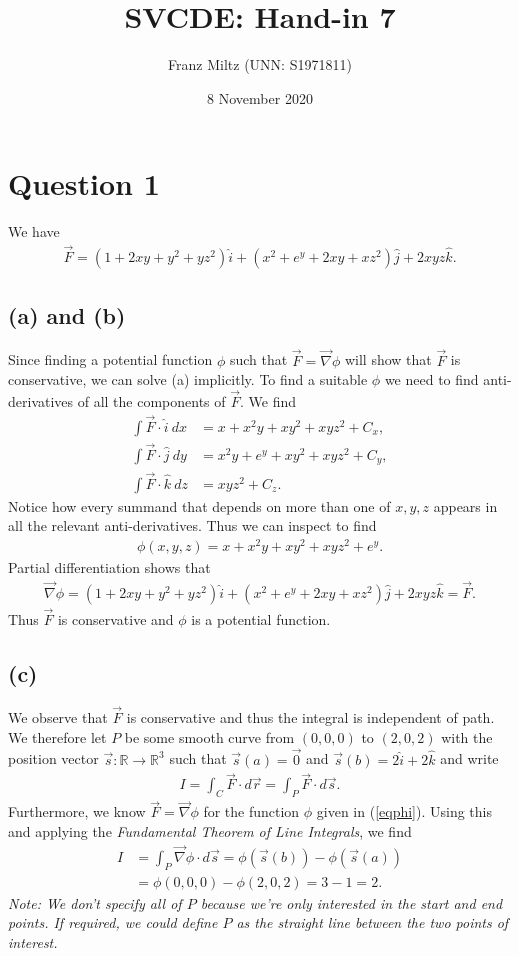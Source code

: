 \documentclass{article}
\newcommand{\R}{\mathbb{R}}
\newcommand{\grad}{\vec\nabla}
\newcommand{\ih}{\widehat i}
\newcommand{\jh}{\widehat j}
\newcommand{\kh}{\widehat k}
\begin{document}
\title{SVCDE: Hand-in 7}
\author{Franz Miltz (UNN: S1971811)}
\date{8 November 2020}
\maketitle
\section*{Question 1}
We have 
\begin{align*}
  \vec F = (1+2xy+y^2+yz^2)\ih + (x^2+e^y+2xy+xz^2)\jh + 2xyz\kh.
\end{align*}
\subsection*{(a) and (b)}
Since finding a potential function $\phi$ such that $\vec F = \grad\phi$ 
will show that $\vec F$ is conservative, we can solve (a) implicitly.
To find a suitable $\phi$ we need to find anti-derivatives of all the components
of $\vec F$. We find
\begin{align*}
  \int \vec F\cdot \ih\: dx &= x + x^2y + xy^2 + xyz^2 + C_x,\\
  \int \vec F\cdot \jh\: dy &= x^2y+e^y+xy^2+xyz^2+C_y,\\
  \int \vec F\cdot \kh\: dz &= xyz^2 + C_z.
\end{align*}
Notice how every summand that depends on more than one of $x,y,z$ appears 
in all the relevant anti-derivatives. Thus we can inspect to find
\begin{align}
  \label{eqphi}
  \phi(x,y,z) = x + x^2y + xy^2 + xyz^2 + e^y.
\end{align}
Partial differentiation shows that
\begin{align*}
  \grad \phi = (1+2xy+y^2+yz^2)\ih + (x^2+e^y+2xy+xz^2)\jh + 2xyz\kh = \vec F.
\end{align*}
Thus $\vec F$ is conservative and $\phi$ is a potential function.
\subsection*{(c)}
We observe that $\vec F$ is conservative and thus the integral is independent of
path. We therefore let $P$ be some smooth curve from $(0,0,0)$ to $(2,0,2)$ with the
position vector $\vec s:\R\to\R^3$ such that $\vec s(a)=\vec 0$ and $\vec s(b)=2\ih + 2\kh$
and write
\begin{align*}
  I=\int_C \vec F \cdot d\vec r = \int_P \vec F \cdot d\vec s.
\end{align*}
Furthermore, we know $\vec F=\grad\phi$ for the function $\phi$ given in (\ref{eqphi}).
Using this and applying the \emph{Fundamental Theorem of Line Integrals}, we find
\begin{align*}
  I &= \int_P \grad \phi\cdot d\vec s = \phi(\vec s(b))-\phi(\vec s(a)) \\
  &= \phi(0,0,0)-\phi(2,0,2) = 3 - 1 = 2.
\end{align*}
\emph{Note: We don't specify all of $P$ because we're only interested in the start
and end points. If required, we could define $P$ as the straight line between
the two points of interest.}
\end{document}
